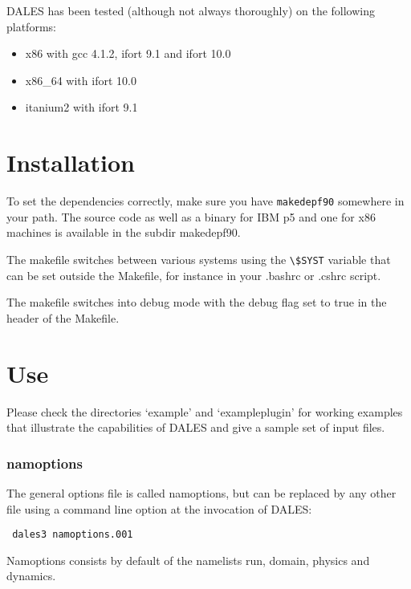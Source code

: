 \documentclass[a4paper,10pt]{article}
\begin{document}
DALES has been tested (although not always thoroughly) on the following platforms:
\begin{itemize}
\item x86 with gcc 4.1.2, ifort 9.1 and ifort 10.0
\item x86\_64 with ifort 10.0
\item itanium2 with ifort 9.1
\end{itemize}

\section{Installation}
To set the dependencies correctly, make sure you have \verb"makedepf90" somewhere in your path. The source code as well as a binary for IBM p5 and one for x86 machines is available in the subdir makedepf90.

The makefile switches between various systems using the \verb"\$SYST" variable that can be set outside the Makefile, for instance in your .bashrc or .cshrc script.

The makefile switches into debug mode with the debug flag set to true in the header of the Makefile.

\section{Use}
Please check the directories `example' and `exampleplugin' for working examples that illustrate the capabilities of DALES and give a sample set of input files.
\label{input}
\subsubsection*{namoptions}
The general options file is called namoptions, but can be replaced by any other file using a command line option at the invocation of DALES:
\begin{verbatim}
 dales3 namoptions.001
\end{verbatim}

Namoptions consists by default of the namelists run, domain, physics and dynamics.
\end{document}
